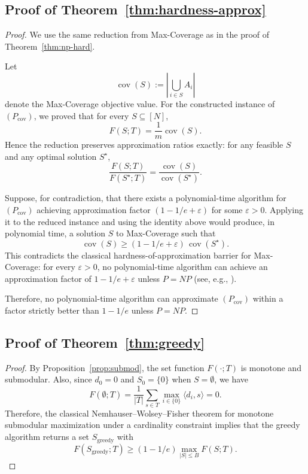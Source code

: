 \documentclass[accepted]{uai2026}
\theoremstyle{plain}
\theoremstyle{definition}
\theoremstyle{remark}
\begin{document}

\subsection{Proof of Theorem~\ref{thm:hardness-approx}}
\label{app:theom4_4}

\begin{proof}
We use the same reduction from Max-Coverage as in the proof of Theorem~\ref{thm:np-hard}.

Let
\[
\operatorname{cov}(S):=\left|\bigcup_{i\in S}A_i\right|
\]
denote the Max-Coverage objective value. For the constructed instance of $(P_{\mathrm{cov}})$, we proved that for every $S\subseteq[N]$,
\[
F(S;T)=\frac{1}{m}\operatorname{cov}(S).
\]
Hence the reduction preserves approximation ratios exactly:
for any feasible $S$ and any optimal solution $S^\star$,
\[
\frac{F(S;T)}{F(S^\star;T)}
=
\frac{\operatorname{cov}(S)}{\operatorname{cov}(S^\star)}.
\]

Suppose, for contradiction, that there exists a polynomial-time algorithm for $(P_{\mathrm{cov}})$ achieving approximation factor $(1-1/e+\varepsilon)$ for some $\varepsilon>0$. Applying it to the reduced instance and using the identity above would produce, in polynomial time, a solution $S$ to Max-Coverage such that
\[
\operatorname{cov}(S)\ge (1-1/e+\varepsilon)\,\operatorname{cov}(S^\star).
\]
This contradicts the classical hardness-of-approximation barrier for Max-Coverage: for every $\varepsilon > 0$, no polynomial-time algorithm can achieve an approximation factor of $1 - 1/e + \varepsilon$ unless $P = NP$ (see, e.g., \cite{feige1998threshold}).

Therefore, no polynomial-time algorithm can approximate $(P_{\mathrm{cov}})$ within a factor strictly better than $1-1/e$ unless $P=NP$.
\end{proof}


\subsection{Proof of Theorem~\ref{thm:greedy}}
\label{app:thm4_5}

\begin{proof}
By Proposition~\ref{prop:submod}, the set function $F(\cdot;T)$ is monotone and submodular. Also, since $d_0=0$ and $S_0=\{0\}$ when $S=\emptyset$, we have
\[
F(\emptyset;T)=\frac1{|T|}\sum_{s\in T}\max_{i\in \{0\}}\langle d_i,s\rangle=0.
\]
Therefore, the classical Nemhauser--Wolsey--Fisher theorem for monotone submodular maximization under a cardinality constraint implies that the greedy algorithm returns a set $S_{\mathrm{greedy}}$ with
\[
F(S_{\mathrm{greedy}};T)\ge (1-1/e)\max_{|S|\le B}F(S;T).
\]
\end{proof}
\end{document}
